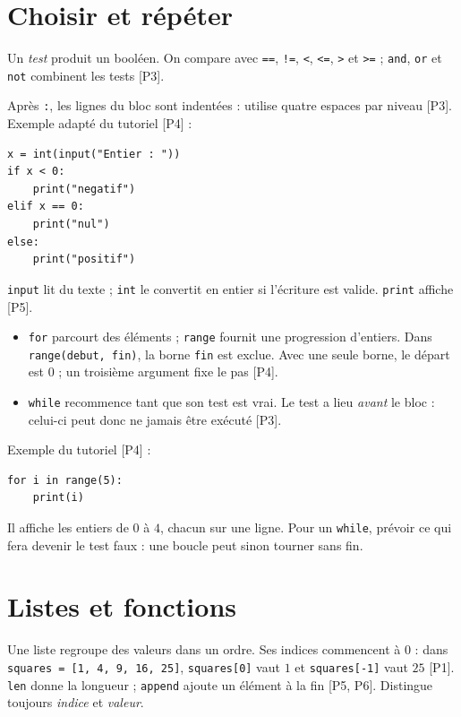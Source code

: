 \documentclass[11pt]{article}
\begin{document}
\section{Choisir et répéter}\label{sec:boucles}
\begin{definition}
Un \emph{test} produit un booléen. On compare avec \texttt{==}, \texttt{!=}, \texttt{<}, \texttt{<=}, \texttt{>} et \texttt{>=} ; \texttt{and}, \texttt{or} et \texttt{not} combinent les tests [P3].
\end{definition}
Après \texttt{:}, les lignes du bloc sont indentées : utilise quatre espaces par niveau [P3]. Exemple adapté du tutoriel [P4] :
\begin{verbatim}
x = int(input("Entier : "))
if x < 0:
    print("negatif")
elif x == 0:
    print("nul")
else:
    print("positif")
\end{verbatim}
\texttt{input} lit du texte ; \texttt{int} le convertit en entier si l'écriture est valide. \texttt{print} affiche [P5].

\begin{methode}
\begin{itemize}
\item \texttt{for} parcourt des éléments ; \texttt{range} fournit une progression d'entiers. Dans \texttt{range(debut, fin)}, la borne \texttt{fin} est exclue. Avec une seule borne, le départ est $0$ ; un troisième argument fixe le pas [P4].
\item \texttt{while} recommence tant que son test est vrai. Le test a lieu \emph{avant} le bloc : celui-ci peut donc ne jamais être exécuté [P3].
\end{itemize}
\end{methode}
Exemple du tutoriel [P4] :\nopagebreak
\begin{verbatim}
for i in range(5):
    print(i)
\end{verbatim}
Il affiche les entiers de $0$ à $4$, chacun sur une ligne. Pour un \texttt{while}, prévoir ce qui fera devenir le test faux : une boucle peut sinon tourner sans fin.

\section{Listes et fonctions}\label{sec:fonctions}
Une liste regroupe des valeurs dans un ordre. Ses indices commencent à $0$ : dans \texttt{squares = [1, 4, 9, 16, 25]}, \texttt{squares[0]} vaut $1$ et \texttt{squares[-1]} vaut $25$ [P1]. \texttt{len} donne la longueur ; \texttt{append} ajoute un élément à la fin [P5, P6]. Distingue toujours \emph{indice} et \emph{valeur}.
\end{document}
